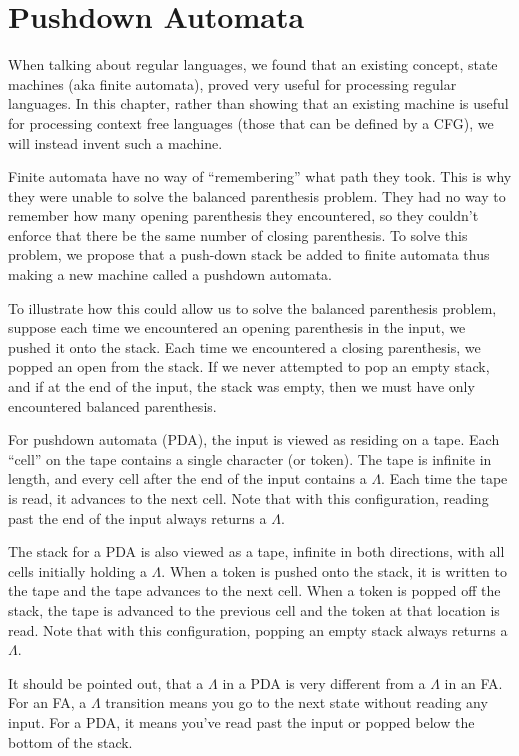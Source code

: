 \documentclass[letterpaper,12pt,openany,reqno]{book}%
\begin{document}
\chapter{Pushdown Automata}
When talking about regular languages, we found that an existing concept, state machines (aka finite automata), proved very useful for processing regular languages. In this chapter, rather than showing that an existing machine is useful for processing context free languages (those that can be defined by a CFG), we will instead invent such a machine.

Finite automata have no way of ``remembering'' what path they took. This is why they were unable to solve the balanced parenthesis problem. They had no way to remember how many opening parenthesis they encountered, so they couldn't enforce that there be the same number of closing parenthesis. To solve this problem, we propose that a push-down stack be added to finite automata thus making a new machine called a pushdown automata.

To illustrate how this could allow us to solve the balanced parenthesis problem, suppose each time we encountered an opening parenthesis in the input, we pushed it onto the stack. Each time we encountered a closing parenthesis, we popped an open from the stack. If we never attempted to pop an empty stack, and if at the end of the input, the stack was empty, then we must have only encountered balanced parenthesis.

For pushdown automata (PDA), the input is viewed as residing on a tape. Each ``cell'' on the tape contains a single character (or token). The tape is infinite in length, and every cell after the end of the input contains a $\Lambda$. Each time the tape is read, it advances to the next cell. Note that with this configuration, reading past the end of the input always returns a $\Lambda$.

The stack for a PDA is also viewed as a tape, infinite in both directions, with all cells initially holding a $\Lambda$. When a token is pushed onto the stack, it is written to the tape and the tape advances to the next cell. When a token is popped off the stack, the tape is advanced to the previous cell and the token at that location is read. Note that with this configuration, popping an empty stack always returns a $\Lambda$.

It should be pointed out, that a $\Lambda$ in a PDA is very different from a $\Lambda$ in an FA. For an FA, a $\Lambda$ transition means you go to the next state without reading any input. For a PDA, it means you've read past the input or popped below the bottom of the stack.
\end{document}
